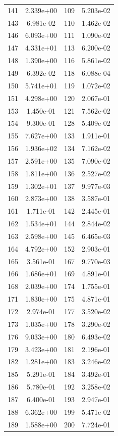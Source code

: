 \documentclass[12pt]{article}
\begin{document}
\begin{longtable}{@{}cccc@{}}
141 & 2.339e+00 & 109 & 5.203e-02 \\
143 & 6.981e-02 & 110 & 1.462e-02 \\
146 & 6.093e+00 & 111 & 1.090e-02 \\
147 & 4.331e+01 & 113 & 6.200e-02 \\
148 & 1.390e+00 & 116 & 5.861e-02 \\
149 & 6.392e-02 & 118 & 6.088e-04 \\
150 & 5.741e+01 & 119 & 1.072e-02 \\
151 & 4.298e+00 & 120 & 2.067e-01 \\
153 & 1.450e-01 & 121 & 7.562e-02 \\
154 & 9.300e-01 & 128 & 5.409e-02 \\
155 & 7.627e+00 & 133 & 1.911e-01 \\
156 & 1.936e+02 & 134 & 7.162e-02 \\
157 & 2.591e+00 & 135 & 7.090e-02 \\
158 & 1.811e+00 & 136 & 2.527e-02 \\
159 & 1.302e+01 & 137 & 9.977e-03 \\
160 & 2.873e+00 & 138 & 3.587e-01 \\
161 & 1.711e-01 & 142 & 2.445e-01 \\
162 & 1.534e+01 & 144 & 2.844e-02 \\
163 & 2.598e+00 & 145 & 6.465e-03 \\
164 & 4.792e+00 & 152 & 2.903e-01 \\
165 & 3.561e-01 & 167 & 9.770e-03 \\
166 & 1.686e+01 & 169 & 4.891e-01 \\
168 & 2.039e+00 & 174 & 1.755e-01 \\
171 & 1.830e+00 & 175 & 4.871e-01 \\
172 & 2.974e-01 & 177 & 3.520e-02 \\
173 & 1.035e+00 & 178 & 3.290e-02 \\
176 & 9.033e+00 & 180 & 6.493e-02 \\
179 & 3.423e+00 & 181 & 2.196e-01 \\
182 & 1.281e+00 & 183 & 3.246e-02 \\
185 & 5.291e-01 & 184 & 3.492e-01 \\
186 & 5.780e-01 & 192 & 3.258e-02 \\
187 & 6.400e-01 & 193 & 2.947e-01 \\
188 & 6.362e+00 & 199 & 5.471e-02 \\
189 & 1.588e+00 & 200 & 7.724e-01 \\

\end{longtable}
\end{document}
